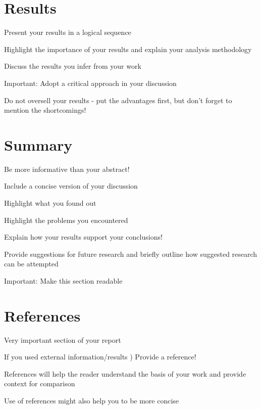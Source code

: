 \documentclass[lnicst,a4paper]{svmultln}
\begin{document}

\section{Results}
Present your results in a logical sequence

Highlight the importance of your results and explain your
analysis methodology

Discuss the results you infer from your work

Important:
Adopt a critical approach in your discussion

Do not oversell your results - put the advantages first, but
don’t forget to mention the shortcomings!





\section{Summary}

Be more informative than your abstract!

Include a concise version of your discussion

Highlight what you found out

Highlight the problems you encountered

Explain how your results support your conclusions!

Provide suggestions for future research and briefly outline how
suggested research can be attempted

Important:
Make this section readable





\section{References}
Very important section of your report

If you used external information/results
)
Provide a
reference!

References will help the reader understand the basis of your
work and provide context for comparison

Use of references might also help you to be more concise
\end{document}
